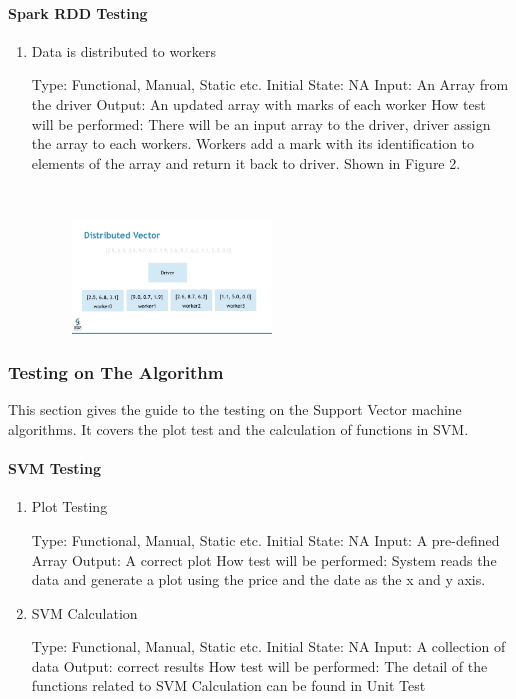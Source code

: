 \documentclass[12pt, titlepage]{article}
\begin{document}
\paragraph{ Spark RDD Testing}


\begin{enumerate}

\item{Data is distributed to workers\\}

Type: Functional, Manual, Static etc.
Initial State: NA
Input: An Array from the driver
Output: An updated array with marks of each worker
How test will be performed: There will be an input array to the driver, driver assign the array to each workers. Workers add a mark with its identification to elements of the array and return it back to driver. Shown in Figure 2.

~\newline
\begin{figure}[h!]
\begin{center}
{
\includegraphics[width=0.5\textwidth]{sparkrdd.png}
}
\caption{\label{Input Data}}
\end{center}
\end{figure}

\end{enumerate}

\subsubsection{Testing on The Algorithm}
This section gives the guide to the testing on the Support Vector machine algorithms. It covers the plot test and the calculation of functions in SVM.
\paragraph{SVM Testing}

\begin{enumerate}

\item{Plot Testing\\}

Type: Functional, Manual, Static etc.
Initial State: NA
Input: A pre-defined Array
Output: A correct plot
How test will be performed: System reads the data and generate a plot using the price and the date as the x and y axis.

\item{SVM Calculation \\}

Type: Functional, Manual, Static etc.
Initial State: NA
Input: A collection of data
Output: correct results
How test will be performed: The detail of the functions related to SVM Calculation can be found in Unit Test

\end{enumerate}
\end{document}
